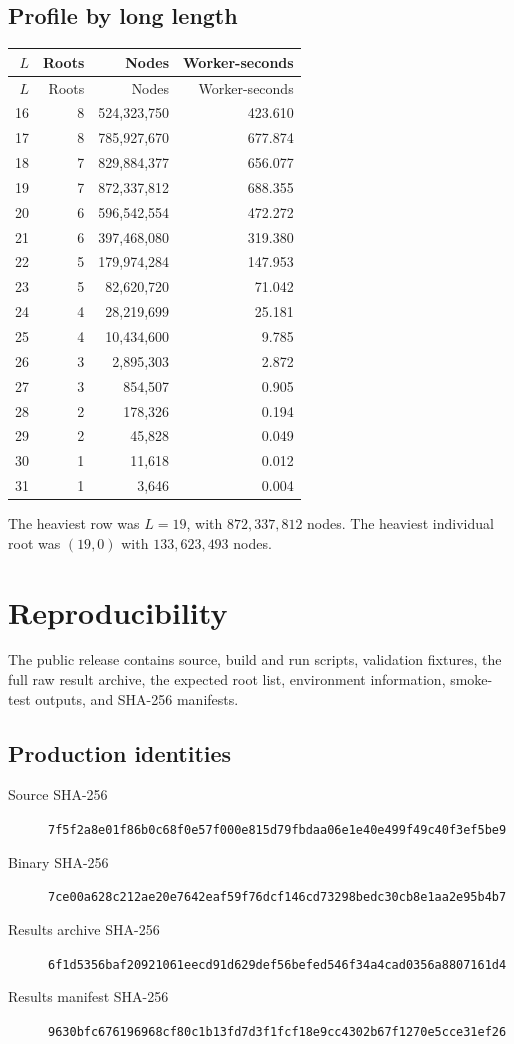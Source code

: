 \documentclass[11pt,a4paper]{article}
\theoremstyle{definition}\newtheorem{definition}[theorem]{Definition}
\theoremstyle{remark}\newtheorem{remark}[theorem]{Remark}
\newcommand{\code}[1]{\texttt{#1}}
\begin{document}
\subsection{Profile by long length}
\begin{longtable}{@{}rrrr@{}}
\toprule $L$ & Roots & Nodes & Worker-seconds\\\midrule
\endfirsthead
\toprule $L$ & Roots & Nodes & Worker-seconds\\\midrule
\endhead
16 & 8 & 524,323,750 & 423.610  \\
17 & 8 & 785,927,670 & 677.874  \\
18 & 7 & 829,884,377 & 656.077  \\
19 & 7 & 872,337,812 & 688.355  \\
20 & 6 & 596,542,554 & 472.272  \\
21 & 6 & 397,468,080 & 319.380  \\
22 & 5 & 179,974,284 & 147.953  \\
23 & 5 & 82,620,720 & 71.042  \\
24 & 4 & 28,219,699 & 25.181  \\
25 & 4 & 10,434,600 & 9.785  \\
26 & 3 & 2,895,303 & 2.872  \\
27 & 3 & 854,507 & 0.905  \\
28 & 2 & 178,326 & 0.194  \\
29 & 2 & 45,828 & 0.049  \\
30 & 1 & 11,618 & 0.012  \\
31 & 1 & 3,646 & 0.004 \\
\bottomrule
\end{longtable}
The heaviest row was $L=19$, with $872{,}337{,}812$ nodes. The heaviest individual root was $(19,0)$ with $133{,}623{,}493$ nodes.

\section{Reproducibility}
The public release contains source, build and run scripts, validation fixtures, the full raw result archive, the expected root list, environment information, smoke-test outputs, and SHA-256 manifests.

\subsection{Production identities}
\begin{description}
\item[Source SHA-256] \code{7f5f2a8e01f86b0c68f0e57f000e815d79fbdaa06e1e40e499f49c40f3ef5be9}
\item[Binary SHA-256] \code{7ce00a628c212ae20e7642eaf59f76dcf146cd73298bedc30cb8e1aa2e95b4b7}
\item[Results archive SHA-256] \code{6f1d5356baf20921061eecd91d629def56befed546f34a4cad0356a8807161d4}
\item[Results manifest SHA-256] \code{9630bfc676196968cf80c1b13fd7d3f1fcf18e9cc4302b67f1270e5cce31ef26}
\end{description}
\end{document}
